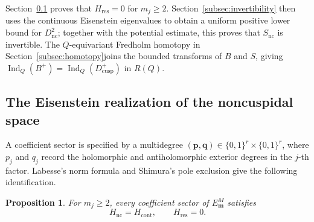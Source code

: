 \documentclass[11pt]{article}
\theoremstyle{definition}
\theoremstyle{plain}
\numberwithin{equation}{section}
\newtheorem{proposition}[theorem]{Proposition}
\newcommand{\cusp}{\mathrm{cusp}}
\newcommand{\nc}{\mathrm{nc}}
\newcommand{\res}{\mathrm{res}}
\newcommand{\cont}{\mathrm{cont}}
\newcommand{\Ind}{\operatorname{Ind}}
\begin{document}
Section~\ref{subsec:eisenstein} proves that $H_{\res}=0$ for $m_j\geq2$. 	Section~\ref{subsec:invertibility} then uses
the continuous Eisenstein eigenvalues to obtain a uniform positive lower bound for
$D_{\nc}^2$; together with the potential estimate, this proves that $S_{\nc}$ is
invertible. The $Q$-equivariant Fredholm homotopy in Section~\ref{subsec:homotopy}joins the
bounded transforms of $B$ and $S$, giving $\Ind_Q(B^+)=\Ind_Q(D_{\cusp}^+)$ in
$R(Q)$.

\subsection{The Eisenstein realization of the noncuspidal space}
\label{subsec:eisenstein}

A coefficient sector is specified by a multidegree
$(\boldsymbol p,\boldsymbol q)\in\{0,1\}^r\times\{0,1\}^r$,
where $p_j$ and $q_j$ record the holomorphic and antiholomorphic
exterior degrees in the $j$-th factor.
Labesse's norm formula and Shimura's pole exclusion give
the following identification.
\begin{proposition}\label{prop:eisenstein}
For $m_j\geq2$, every coefficient sector of $E_{\boldsymbol m}^{M}$ satisfies
\begin{equation}\label{eq:eisenstein-completion}
 H_{\nc}=H_{\cont},\qquad H_{\res}=0.
\end{equation}
\end{proposition}
\end{document}
